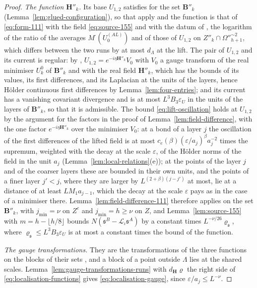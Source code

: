 \begin{proof}
\emph{The function $\mathbf H''_k$.} Its base $U_{1,2}$ satisfies \cite[(14)]{BalabanVAR} for the set $\mathbf B''_k$ (Lemma~\ref{lem:glued-configuration}), so that \cite[Sects.~D, E]{BalabanVAR} apply and the function is that of \eqref{eq:form-111} with the field \eqref{eq:source-155} and with the datum of \cite[(1.54)]{BalabanLFR2}, the logarithm of the ratio of the averages $M^\cdot(U^{(AL)}_0)$ and of those of $U_{1,2}$ on $Z''_k \cap \Omega''^{\sim2}_{h+1}$, which differs between the two runs by at most $d_\Lambda$ at the lift. The pair of $U_{1,2}$ and its current is regular: by \cite[(1.54)]{BalabanLFR2}, $U_{1,2} = e^{-i\eta\mathbf H''_k}V_0$ with $V_0$ a gauge transform of the real minimiser $U^0_k$ of $\mathbf B''_k$ and with the real field $\mathbf H''_k$, which has the bounds \cite[(19), p.~281]{BalabanVAR} of its values, its first differences, and its Laplacian at the units of the layers, hence H\"older continuous first differences by Lemma~\ref{lem:four-entries}; and its current has a vanishing covariant divergence and is at most $L^3B_3\varepsilon_U$ in the units of the layers of $\mathbf B''_k$, so that it is admissible. The bound \eqref{eq:lift-oscillation} holds at $U_{1,2}$ by the argument for the factors in the proof of Lemma~\ref{lem:field-difference}, with the one factor $e^{-i\eta\mathbf H''_k}$ over the minimiser $V_0$: at a bond of a layer $j$ the oscillation of the first differences of the lifted field is at most $c_e(\beta)(\varepsilon/a_j)^\beta a_j^{-2}$ times the supremum, weighted with the decay at the scale $\varepsilon$, of the H\"older norms of the field in the unit $a_j$ (Lemma~\ref{lem:local-relations}(e)); at the points of the layer $j$ and of the coarser layers these are bounded in their own units, and the points of a finer layer $j' < j$, where they are larger by $L^{(2+\beta)(j-j')}$ at most, lie at a distance of at least $LM_1a_{j-1}$, which the decay at the scale $\varepsilon$ pays as in the case of a minimiser there. Lemma~\ref{lem:field-difference-111} therefore applies on the set $\mathbf B''_k$, with $j_{\min} = \nu$ on $Z^c$ and $j_{\min} = h \geq \nu$ on $Z$, and Lemma~\ref{lem:source-155} with $m = h - \lfloor h/8\rfloor$ bounds $N(\mathfrak s^B - \mathcal L_\iota\mathfrak s^A)$ by a constant times $L^{-\nu/26}\varrho_{\mathfrak s}$, where $\varrho_{\mathfrak s} \leq L^3B_3\varepsilon_U$ is at most a constant times the bound of the function.

\emph{The gauge transformations.} They are the transformations \cite[(106)]{BalabanAVG} of the three functions on the blocks of their sets \cite[p.~373, ll.~29--30, 44; p.~374, ll.~38--39]{BalabanLFR2}, and a block of a point outside $\Lambda$ lies at the shared scales. Lemma~\ref{lem:gauge-transformations-runs} with $d_{\mathbf H}\varrho$ the right side of \eqref{eq:localisation-functions} gives \eqref{eq:localisation-gauge}, since $\varepsilon/a_j \leq L^{-\nu}$.


\end{proof}

